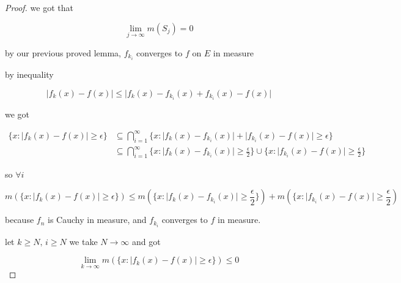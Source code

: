 \documentclass[11pt,a4paper]{article}
\begin{document}
\begin{proof}
    we got that

    \[
        \lim_{j \to \infty}m(S_j) = 0
    \]

    by our previous proved lemma, $f_{k_i}$ converges to $f$ on $E$ in measure

    by inequality

    \[
        \lvert f_k(x) - f(x)\rvert \le \lvert f_k(x) - f_{k_i}(x) + f_{k_i}(x) - f(x)\rvert
    \]

    we got

    \begin{align*}
        \{x: \lvert f_k(x) - f(x)\rvert \ge \epsilon \} & \subseteq  \bigcap_{i=1}^{\infty} \{x: \lvert f_k(x) - f_{k_{i}}(x)\rvert + \lvert f_{k_{i}}(x) - f(x)\rvert \ge \epsilon \} \\
        & \subseteq \bigcap_{i=1}^{\infty} \{x: \lvert f_k(x) - f_{k_{i}}(x) \rvert \ge \frac{\epsilon}{2}  \} \cup \{x: \lvert f_{k_i}(x) - f(x) \rvert \ge \frac{\epsilon}{2}  \}
    \end{align*}

    so $\forall i$

    \[
        m\left( \{x: \lvert f_k(x) - f(x)\rvert \ge \epsilon \} \right) \le m\left(\{x: \lvert f_{k}(x) - f_{k_i}(x) \rvert \ge \frac{\epsilon}{2} \} \right) + m\left(\{x: \lvert f_{k_i}(x) - f(x) \rvert \ge \frac{\epsilon}{2} \right)
    \]

    because $f_n$ is Cauchy in measure, and $f_{k_i}$ converges to $f$ in measure. 
    
    let $k \ge N,\, i \ge N$  we take $N \to \infty$ and got

    \[
        \lim_{k \to \infty} m\left( \{x: \lvert f_k(x) - f(x)\rvert \ge \epsilon \} \right) \le  0
    \]

\end{proof}
\end{document}
